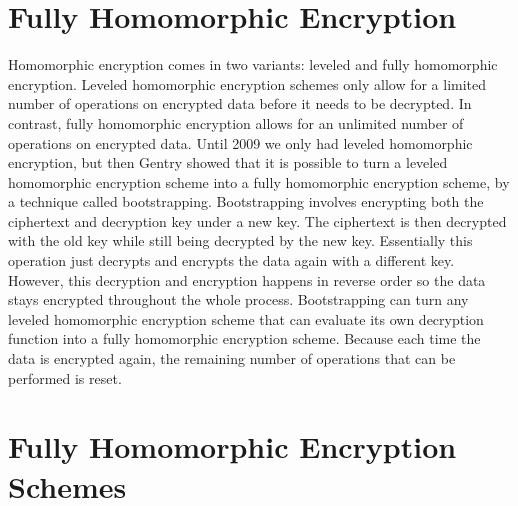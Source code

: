 \documentclass[english,master=eelt,masteroption=ec]{kulemt}
\begin{document}
\section{Fully Homomorphic Encryption}
Homomorphic encryption comes in two variants: leveled and fully homomorphic encryption. Leveled homomorphic encryption schemes only allow for a limited number of operations on encrypted data before it needs to be decrypted. In contrast, fully homomorphic encryption allows for an unlimited number of operations on encrypted data. Until 2009 we only had leveled homomorphic encryption, but then Gentry \cite{10.1145/1536414.1536440} showed that it is possible to turn a leveled homomorphic encryption scheme into a fully homomorphic encryption scheme, by a technique called bootstrapping. Bootstrapping involves encrypting both the ciphertext and decryption key under a new key. The ciphertext is then decrypted with the old key while still being decrypted by the new key. Essentially this operation just decrypts and encrypts the data again with a different key. However, this decryption and encryption happens in reverse order so the data stays encrypted throughout the whole process. Bootstrapping can turn any leveled homomorphic encryption scheme that can evaluate its own decryption function into a fully homomorphic encryption scheme. Because each time the data is encrypted again, the remaining number of operations that can be performed is reset.

\section{Fully Homomorphic Encryption Schemes}
\end{document}
